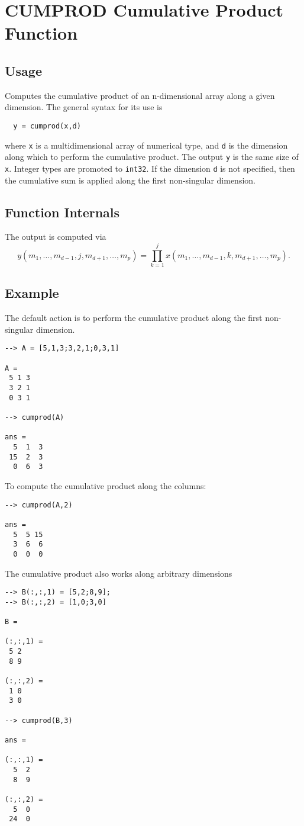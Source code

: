 \section{CUMPROD Cumulative Product Function}

\subsection{Usage}

Computes the cumulative product of an n-dimensional array along a given
dimension.  The general syntax for its use is
\begin{verbatim}
  y = cumprod(x,d)
\end{verbatim}
where \verb|x| is a multidimensional array of numerical type, and \verb|d|
is the dimension along which to perform the cumulative product.  The
output \verb|y| is the same size of \verb|x|.  Integer types are promoted
to \verb|int32|. If the dimension \verb|d| is not specified, then the
cumulative sum is applied along the first non-singular dimension.
\subsection{Function Internals}

The output is computed via
\[
  y(m_1,\ldots,m_{d-1},j,m_{d+1},\ldots,m_{p}) = 
  \prod_{k=1}^{j} x(m_1,\ldots,m_{d-1},k,m_{d+1},\ldots,m_{p}).
\]
\subsection{Example}

The default action is to perform the cumulative product along the
first non-singular dimension.
\begin{verbatim}
--> A = [5,1,3;3,2,1;0,3,1]

A = 
 5 1 3 
 3 2 1 
 0 3 1 

--> cumprod(A)

ans = 
  5  1  3 
 15  2  3 
  0  6  3 
\end{verbatim}
To compute the cumulative product along the columns:
\begin{verbatim}
--> cumprod(A,2)

ans = 
  5  5 15 
  3  6  6 
  0  0  0 
\end{verbatim}
The cumulative product also works along arbitrary dimensions
\begin{verbatim}
--> B(:,:,1) = [5,2;8,9];
--> B(:,:,2) = [1,0;3,0]

B = 

(:,:,1) = 
 5 2 
 8 9 

(:,:,2) = 
 1 0 
 3 0 

--> cumprod(B,3)

ans = 

(:,:,1) = 
  5  2 
  8  9 

(:,:,2) = 
  5  0 
 24  0 
\end{verbatim}
